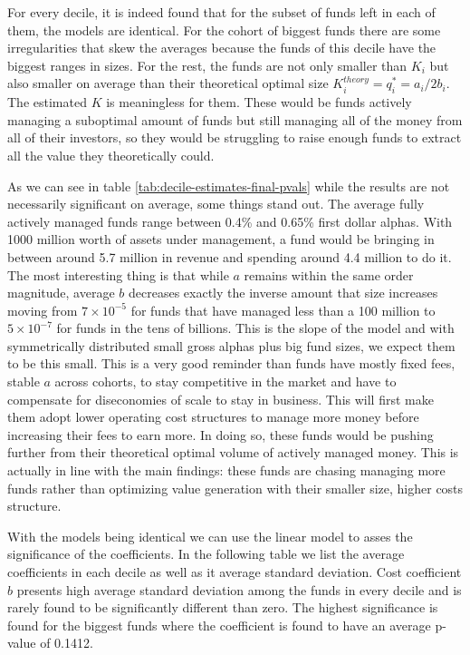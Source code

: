 \documentclass[12pt]{article}
\begin{document}
For every decile, it is indeed found that for the subset of funds left in each of them, the models are identical. For the cohort of biggest funds there are some irregularities that skew the averages because the funds of this decile have the biggest ranges in sizes. For the rest, the funds are not only smaller than $K_i$ but also smaller on average than their theoretical optimal size $K_i^{theory}=q_i^*=a_i/2b_i$. The estimated $K$ is meaningless for them. These would be funds actively managing a suboptimal amount of funds but still managing all of the money from all of their investors, so they would be struggling to raise enough funds to extract all the value they theoretically could.
\par As we can see in table \ref{tab:decile-estimates-final-pvals} while the results are not necessarily significant on average, some things stand out. The average fully actively managed funds range between 0.4\% and 0.65\% first dollar alphas. With 1000 million worth of assets under management, a fund would be bringing in between around 5.7 million in revenue and spending around 4.4 million to do it. The most interesting thing is that while $a$ remains within the same order magnitude, average $b$ decreases exactly the inverse amount that size increases moving from $7\times10^{-5}$ for funds that have managed less than a 100 million to $5\times10^{-7}$ for funds in the tens of billions. This is the slope of the model and with symmetrically distributed small gross alphas plus big fund sizes, we expect them to be this small. This is a very good reminder than funds have mostly fixed fees, stable $a$ across cohorts, to stay competitive in the market and have to compensate for diseconomies of scale to stay in business. This will first make them adopt lower operating cost structures to manage more money before increasing their fees to earn more. In doing so, these funds would be pushing further from their theoretical optimal volume of actively managed money. This is actually in line with the main findings: these funds are chasing managing more funds rather than optimizing value generation with their smaller size, higher costs structure. 

\par
With the models being identical we can use the linear model to asses the significance of the coefficients. In the following table we list the average coefficients in each decile as well as it average standard deviation. Cost coefficient $b$ presents high average standard deviation among the funds in every decile and is rarely found to be significantly different than zero. The highest significance is found for the biggest funds where the coefficient is found to have an average p-value of 0.1412.
\end{document}

